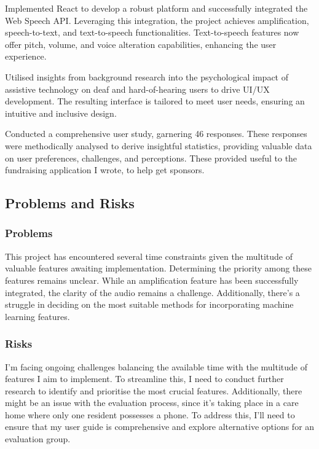 \documentclass[11pt]{article}
\begin{document}

Implemented React to develop a robust platform and successfully integrated the Web Speech API. Leveraging this integration, the project achieves amplification, speech-to-text, and text-to-speech functionalities. Text-to-speech features now offer pitch, volume, and voice alteration capabilities, enhancing the user experience.

Utilised insights from background research into the psychological impact of assistive technology on deaf and hard-of-hearing users to drive UI/UX development. The resulting interface is tailored to meet user needs, ensuring an intuitive and inclusive design. 

Conducted a comprehensive user study, garnering 46 responses. These responses were methodically analysed to derive insightful statistics, providing valuable data on user preferences, challenges, and perceptions. These provided useful to the fundraising application I wrote, to help get sponsors.

\subsection{Problems and Risks}

\subsubsection{Problems}

This project has encountered several time constraints given the multitude of valuable features awaiting implementation. Determining the priority among these features remains unclear. While an amplification feature has been successfully integrated, the clarity of the audio remains a challenge. Additionally, there’s a struggle in deciding on the most suitable methods for incorporating machine learning features.

\subsubsection{Risks}

I’m facing ongoing challenges balancing the available time with the multitude of features I aim to implement. To streamline this, I need to conduct further research to identify and prioritise the most crucial features. Additionally, there might be an issue with the evaluation process, since it’s taking place in a care home where only one resident possesses a phone. To address this, I’ll need to ensure that my user guide is comprehensive and explore alternative options for an evaluation group.
\end{document}
